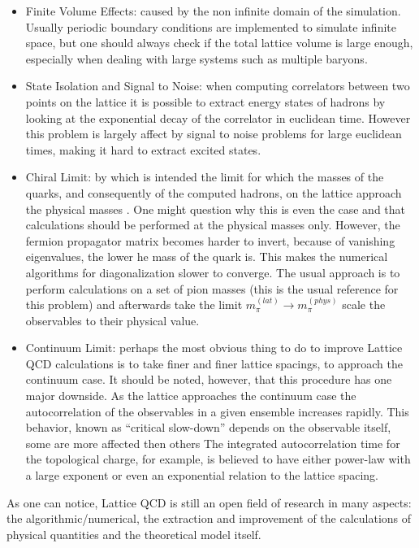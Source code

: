 \begin{itemize}
    \item Finite Volume Effects: caused by the non infinite domain of the simulation. Usually periodic boundary conditions are implemented to simulate infinite space, but one should always check if the total lattice volume is large enough, especially when dealing with large systems such as multiple baryons.
    \item State Isolation and Signal to Noise: when computing correlators between two points on the lattice it is possible to extract energy  states of hadrons by looking at the exponential decay of the correlator in euclidean time. However this problem is largely affect by signal to noise problems for large euclidean times, making it hard to extract excited states.
    \item Chiral Limit: by which is intended the limit for which the masses of the quarks, and consequently of the computed hadrons, on the lattice approach the physical masses \cite{fukaya_chiral_2008}. One might question why this is even the case and that calculations should be performed at the physical masses only. However, the fermion propagator matrix becomes harder to invert, because of vanishing eigenvalues, the lower he mass of the quark is. This makes the numerical algorithms for diagonalization slower to converge. The usual approach is to perform calculations on a set of pion masses (this is the usual reference for this problem) and afterwards take the limit $m_\pi^{(lat)} \rightarrow m_\pi^{(phys)}$ scale the observables to their physical value.
    \item Continuum Limit: perhaps the most obvious thing to do to improve Lattice QCD calculations is to take finer and finer lattice spacings, to approach the continuum case. It should be noted, however, that this procedure has one major downside. As the lattice approaches the continuum case the autocorrelation of the observables in a given ensemble increases rapidly. This behavior, known as ``critical slow-down'' \cite{schaefer_critical_2011} depends on the observable itself, some are more affected then others  The integrated autocorrelation time for the topological charge, for example, is believed to have either  power-law with a large exponent or even an exponential relation to the lattice spacing. 
\end{itemize}
As one can notice, Lattice QCD is still an open field of research in many aspects: the algorithmic/numerical, the extraction and improvement of the calculations of physical quantities and the theoretical model itself. 

